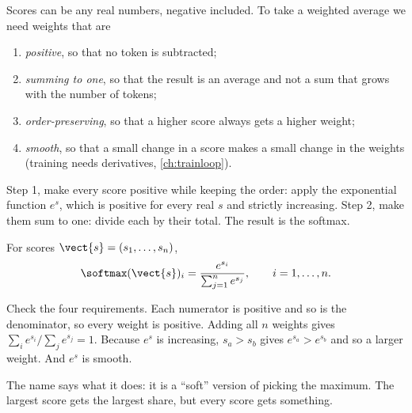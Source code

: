 Scores can be any real numbers, negative included. To take a weighted average we need weights
that are
\begin{enumerate}
  \item \emph{positive}, so that no token is subtracted;
  \item \emph{summing to one}, so that the result is an average and not a sum that grows with
  the number of tokens;
  \item \emph{order-preserving}, so that a higher score always gets a higher weight;
  \item \emph{smooth}, so that a small change in a score makes a small change in the weights
  (training needs derivatives, \cref{ch:trainloop}).
\end{enumerate}
Step 1, make every score positive while keeping the order: apply the exponential function
$e^{s}$, which is positive for every real $s$ and strictly increasing. Step 2, make them sum to
one: divide each by their total. The result is the softmax.

\begin{definition}[Softmax]
For scores $\vect{s} = (s_1, \dots, s_n)$,
\begin{equation}\label{eq:attention:softmax}
  \softmax(\vect{s})_i = \frac{e^{s_i}}{\sum_{j=1}^{n} e^{s_j}}, \qquad i = 1,\dots,n.
\end{equation}
\end{definition}

Check the four requirements. Each numerator is positive and so is the denominator, so every
weight is positive. Adding all $n$ weights gives $\sum_i e^{s_i} / \sum_j e^{s_j} = 1$. Because
$e^{s}$ is increasing, $s_a > s_b$ gives $e^{s_a} > e^{s_b}$ and so a larger weight. And $e^s$ is
smooth.

The name says what it does: it is a ``soft'' version of picking the maximum. The largest score
gets the largest share, but every score gets something.

